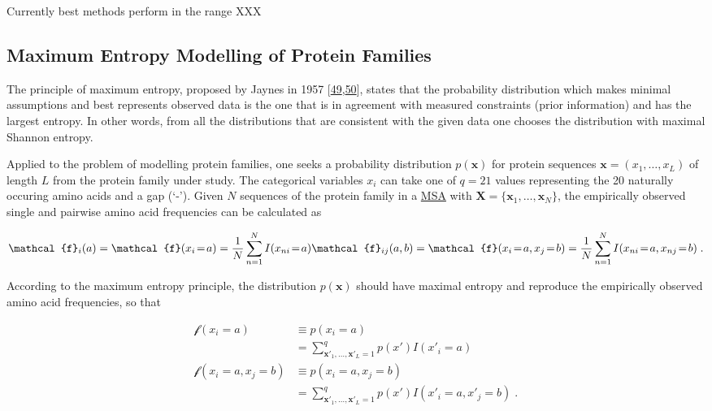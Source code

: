 \documentclass[12pt,a4paper,twoside]{book}
\newcommand{\eq}{\!=\!}
\newcommand{\seq}{\mathbf{x}}
\newcommand{\X}{\mathbf{X}}
\theoremstyle{definition}
\theoremstyle{definition}
\theoremstyle{remark}
\begin{document}
Currently best methods perform in the range XXX

\subsection{Maximum Entropy Modelling of Protein Families}\label{maxent}

The principle of maximum entropy, proposed by Jaynes in 1957
{[}\protect\hyperlink{ref-Jaynes1957a}{49},\protect\hyperlink{ref-Jaynes1957b}{50}{]},
states that the probability distribution which makes minimal assumptions
and best represents observed data is the one that is in agreement with
measured constraints (prior information) and has the largest entropy. In
other words, from all the distributions that are consistent with the
given data one chooses the distribution with maximal Shannon entropy.

Applied to the problem of modelling protein families, one seeks a
probability distribution \(p(\seq)\) for protein sequences
\(\seq = (x_1, \ldots, x_L)\) of length \(L\) from the protein family
under study. The categorical variables \(x_{i}\) can take one of
\(q=21\) values representing the 20 naturally occuring amino acids and a
gap (`-'). Given \(N\) sequences of the protein family in a
\protect\hyperlink{abbrev}{MSA} with
\(\X = \{ \seq_1, \ldots, \seq_N \}\), the empirically observed single
and pairwise amino acid frequencies can be calculated as

\begin{equation}
    \mathcal{f}_i(a) = \mathcal{f}(x_i\eq a) = \frac{1}{N}\sum_{n=1}^N I(x_{ni} \eq a) \\
    \mathcal{f}_{ij}(a,b) = \mathcal{f}(x_i\eq a, x_j\eq b) = \frac{1}{N} \sum_{n=1}^N I(x_{ni} \eq a, x_{nj} \eq b) \; .
 \label{eq:emp-freq}
\end{equation}

According to the maximum entropy principle, the distribution \(p(\seq)\)
should have maximal entropy and reproduce the empirically observed amino
acid frequencies, so that

\begin{align}
   \mathcal{f}(x_i\eq a)            &\equiv p(x_i\eq a)  \\
                                    &= \sum_{\seq\prime_1, \ldots, \seq\prime_L = 1}^{q} p(x\prime) I(x\prime_i \eq a) \\
  \mathcal{f}(x_i\eq a, x_j\eq b)   &\equiv p(x_i\eq a, x_j \eq b) \\
                                    &= \sum_{\seq\prime_1, \ldots, \seq\prime_L = 1}^{q}  p(x\prime) I(x\prime_i\eq a, x\prime_j \eq b)  \; .
 \label{eq:maxent-reproducing-emp-freq}
\end{align}
\end{document}
